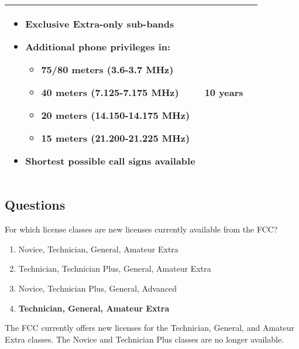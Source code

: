 \begin{table}[h!]
\begin{tabular}{|l|p{9cm}|l|}
\begin{itemize}[noitemsep,topsep=0pt]
            \item Exclusive Extra-only sub-bands
            \item Additional phone privileges in:
                \begin{itemize}[noitemsep]
                    \item 75/80 meters (3.6-3.7 MHz)
                    \item 40 meters (7.125-7.175 MHz)
                    \item 20 meters (14.150-14.175 MHz)
                    \item 15 meters (21.200-21.225 MHz)
                \end{itemize}
            \item Shortest possible call signs available
        \end{itemize} & 
        10 years \\
        \hline
    \end{tabular}
\end{table}

\subsection*{Questions}
\begin{tcolorbox}[colback=gray!10!white,colframe=black!75!black,title={T1C01}]
    For which license classes are new licenses currently available from the FCC?
    \begin{enumerate}[label=\Alph*),noitemsep]
        \item Novice, Technician, General, Amateur Extra
        \item Technician, Technician Plus, General, Amateur Extra
        \item Novice, Technician Plus, General, Advanced
        \item \textbf{Technician, General, Amateur Extra}
    \end{enumerate}
\end{tcolorbox}
The FCC currently offers new licenses for the Technician, General, and Amateur Extra classes. The Novice and Technician Plus classes are no longer available.



